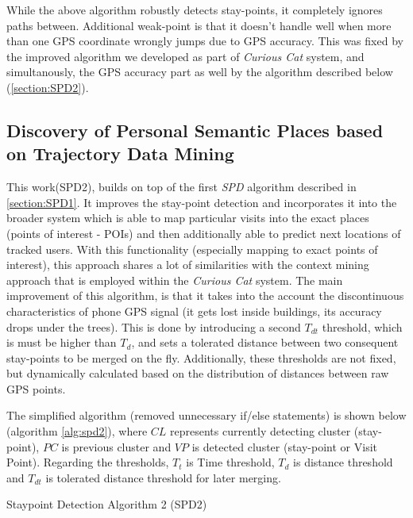 While the above algorithm robustly detects stay-points, it completely ignores
paths between. Additional weak-point is that it doesn't handle well when more
than one GPS coordinate wrongly jumps due to GPS accuracy. This was fixed by
the improved algorithm we developed as part of \emph{Curious Cat} system, and
simultanously, the GPS accuracy part as well by the algorithm described 
below (\autoref{section:SPD2}).

\subsection{Discovery of Personal Semantic Places based on Trajectory Data 
Mining}
\label{section:SPD2}
This work\parencite{Lv2016}(SPD2), builds on top of the first \emph{SPD} algorithm 
described in \autoref{section:SPD1}. It improves the stay-point detection and 
incorporates it into the broader system which is able to map particular visits 
into the exact places (points of interest - POIs) and then additionally able to 
predict next locations of tracked users. With this functionality (especially 
mapping to exact points of interest), this approach shares a lot of similarities
with the context mining approach that is employed within the \emph{Curious Cat} 
system. 
The main improvement of this algorithm, is that it takes into the account the
discontinuous characteristics of phone GPS signal (it gets lost inside buildings,
its accuracy drops under the trees). This is done by introducing a second
$T_{dt}$ threshold, which is must be higher than $T_d$, and sets a tolerated
distance between two consequent stay-points to be merged on the fly. 
Additionally, these thresholds are not fixed, but dynamically calculated based
on the distribution of distances between raw GPS points. 

The simplified algorithm (removed unnecessary if/else statements) is shown 
below (algorithm \ref{alg:spd2}), where $CL$
represents currently detecting cluster (stay-point), $PC$ is previous cluster and
$VP$ is detected cluster (stay-point or Visit Point). Regarding the thresholds,
$T_t$ is Time threshold, $T_d$ is distance threshold and $T_{dt}$ is tolerated
distance threshold for later merging.

\begin{algorithm}[htb]
\caption{Staypoint Detection Algorithm 2 (SPD2)}
\label{alg:spd2}

\vspace{5pt}
\vspace{5pt}
\end{algorithm}

